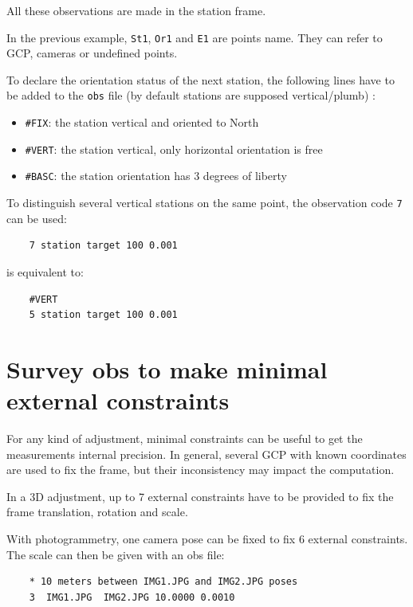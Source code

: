 All these observations are made in the station frame.

In the previous example, {\tt St1}, {\tt Or1} and {\tt E1} are points name.
They can refer to GCP, cameras or undefined points.

To declare the orientation status of the next station, the following lines have to be
added to the {\tt obs} file (by default stations are supposed vertical/plumb) :

\begin{itemize}
    \item \texttt{\#FIX}: the station vertical and oriented to North
    \item \texttt{\#VERT}: the station vertical, only horizontal orientation is free
    \item \texttt{\#BASC}: the station orientation has 3 degrees of liberty 
\end{itemize}

To distinguish several vertical stations on the same point, the observation code {\tt 7} can be used:

\begin{verbatim}
    7 station target 100 0.001
\end{verbatim}

is equivalent to:

\begin{verbatim}
    #VERT
    5 station target 100 0.001
\end{verbatim}


\section{Survey obs to make minimal external constraints}

For any kind of adjustment, minimal constraints can be useful to get the measurements internal precision.
In general, several GCP with known coordinates are used to fix the frame, but their inconsistency may
impact the computation.

In a 3D adjustment, up to 7 external constraints have to be provided to fix the frame translation, rotation and scale.

With photogrammetry, one camera pose can be fixed to fix 6 external constraints. The scale can then be given with an obs file:
\begin{verbatim}
    * 10 meters between IMG1.JPG and IMG2.JPG poses
    3  IMG1.JPG  IMG2.JPG 10.0000 0.0010   
\end{verbatim}

